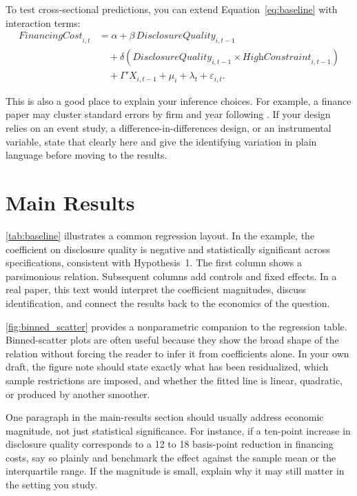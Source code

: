 \documentclass[hidelinks,12pt]{article}
\begin{document}
To test cross-sectional predictions, you can extend Equation~\eqref{eq:baseline} with interaction terms:
\begin{equation}
\label{eq:interaction}
\begin{aligned}
\textit{FinancingCost}_{i,t}
&=
\alpha
+
\beta\,\textit{DisclosureQuality}_{i,t-1}
\\
&\quad
+
\delta\left(\textit{DisclosureQuality}_{i,t-1}\times \textit{HighConstraint}_{i,t-1}\right)
\\
&\quad
+
\Gamma'X_{i,t-1}
+
\mu_i
+
\lambda_t
+
\varepsilon_{i,t}.
\end{aligned}
\end{equation}

This is also a good place to explain your inference choices. For example, a finance paper may cluster standard errors by firm and year following \citet{petersen2009estimating}. If your design relies on an event study, a difference-in-differences design, or an instrumental variable, state that clearly here and give the identifying variation in plain language before moving to the results.

\section{Main Results}
\label{sec:results}

\autoref{tab:baseline} illustrates a common regression layout. In the example, the coefficient on disclosure quality is negative and statistically significant across specifications, consistent with Hypothesis~1. The first column shows a parsimonious relation. Subsequent columns add controls and fixed effects. In a real paper, this text would interpret the coefficient magnitudes, discuss identification, and connect the results back to the economics of the question.

\autoref{fig:binned_scatter} provides a nonparametric companion to the regression table. Binned-scatter plots are often useful because they show the broad shape of the relation without forcing the reader to infer it from coefficients alone. In your own draft, the figure note should state exactly what has been residualized, which sample restrictions are imposed, and whether the fitted line is linear, quadratic, or produced by another smoother.

One paragraph in the main-results section should usually address economic magnitude, not just statistical significance. For instance, if a ten-point increase in disclosure quality corresponds to a 12 to 18 basis-point reduction in financing costs, say so plainly and benchmark the effect against the sample mean or the interquartile range. If the magnitude is small, explain why it may still matter in the setting you study.
\end{document}
